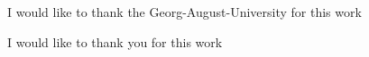 \newcommand{\thank}[2][the Georg-August-University]{I would like to thank #1 for #2}

\thank{this work}

\thank[you]{this work}
